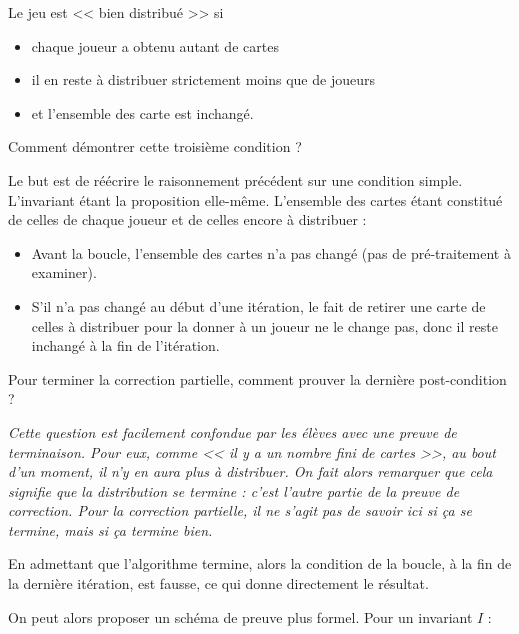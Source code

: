 \begin{exemple}[title = Au tableau]{}{}
Le jeu est << bien distribué >> si 
\begin{itemize}[leftmargin=*,label=$\star$]
    \item chaque joueur a obtenu autant de cartes
    \item il en reste à distribuer strictement moins que de joueurs
    \item et l'ensemble des carte est inchangé.
\end{itemize} 
\end{exemple}

\begin{question}
Comment démontrer cette troisième condition ? 
\end{question}

Le but est de réécrire le raisonnement précédent sur une condition simple. L'invariant étant la proposition elle-même. L'ensemble des cartes étant constitué de celles de chaque joueur et de celles encore à distribuer :


\begin{itemize}
    \item Avant la boucle, l'ensemble des cartes n'a pas changé (pas de pré-traitement à examiner).
    \item S'il n'a pas changé au début d'une itération, le fait de retirer une carte de celles à distribuer pour la donner à un joueur ne le change pas, donc il reste inchangé à la fin de l'itération.
\end{itemize}

\begin{question}
   Pour terminer la correction partielle, comment prouver la dernière post-condition ? 	
\end{question}

\textit{Cette question est facilement confondue par les élèves avec une preuve de terminaison. Pour eux, comme << il y a un nombre fini de cartes >>, au bout d'un moment, il n'y en aura plus à distribuer. On fait alors remarquer que cela signifie que la distribution se termine  : c'est l'autre partie de la preuve de correction. Pour la correction partielle, il ne s'agit pas de savoir ici si ça se termine, mais si ça termine bien.}

En admettant que l'algorithme termine, alors la condition de la boucle, à la fin de la dernière itération, est fausse, ce qui donne directement le résultat.

On peut alors proposer un schéma de preuve plus formel. Pour un invariant $I$ :

